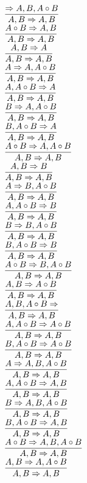 \documentclass[11pt]{article}
\begin{document}
\begin{center}
\bigskip
\\$\infer{A, B\Rightarrow A, B}{\Rightarrow A, B, A\circ B}$
\bigskip
\\$\infer{A, B\Rightarrow A, B}{A\circ B\Rightarrow A, B}$
\bigskip
\\$\infer{A, B\Rightarrow A, B}{A, B\Rightarrow A}$
\bigskip
\\$\infer{A, B\Rightarrow A, B}{A\Rightarrow A, A\circ B}$
\bigskip
\\$\infer{A, B\Rightarrow A, B}{A, A\circ B\Rightarrow A}$
\bigskip
\\$\infer{A, B\Rightarrow A, B}{B\Rightarrow A, A\circ B}$
\bigskip
\\$\infer{A, B\Rightarrow A, B}{B, A\circ B\Rightarrow A}$
\bigskip
\\$\infer{A, B\Rightarrow A, B}{A\circ B\Rightarrow A, A\circ B}$
\bigskip
\\$\infer{A, B\Rightarrow A, B}{A, B\Rightarrow B}$
\bigskip
\\$\infer{A, B\Rightarrow A, B}{A\Rightarrow B, A\circ B}$
\bigskip
\\$\infer{A, B\Rightarrow A, B}{A, A\circ B\Rightarrow B}$
\bigskip
\\$\infer{A, B\Rightarrow A, B}{B\Rightarrow B, A\circ B}$
\bigskip
\\$\infer{A, B\Rightarrow A, B}{B, A\circ B\Rightarrow B}$
\bigskip
\\$\infer{A, B\Rightarrow A, B}{A\circ B\Rightarrow B, A\circ B}$
\bigskip
\\$\infer{A, B\Rightarrow A, B}{A, B\Rightarrow A\circ B}$
\bigskip
\\$\infer{A, B\Rightarrow A, B}{A, B, A\circ B\Rightarrow }$
\bigskip
\\$\infer{A, B\Rightarrow A, B}{A, A\circ B\Rightarrow A\circ B}$
\bigskip
\\$\infer{A, B\Rightarrow A, B}{B, A\circ B\Rightarrow A\circ B}$
\bigskip
\\$\infer{A, B\Rightarrow A, B}{A\Rightarrow A, B, A\circ B}$
\bigskip
\\$\infer{A, B\Rightarrow A, B}{A, A\circ B\Rightarrow A, B}$
\bigskip
\\$\infer{A, B\Rightarrow A, B}{B\Rightarrow A, B, A\circ B}$
\bigskip
\\$\infer{A, B\Rightarrow A, B}{B, A\circ B\Rightarrow A, B}$
\bigskip
\\$\infer{A, B\Rightarrow A, B}{A\circ B\Rightarrow A, B, A\circ B}$
\bigskip
\\$\infer{A, B\Rightarrow A, B}{A, B\Rightarrow A, A\circ B}$

\end{center}
\end{document}
